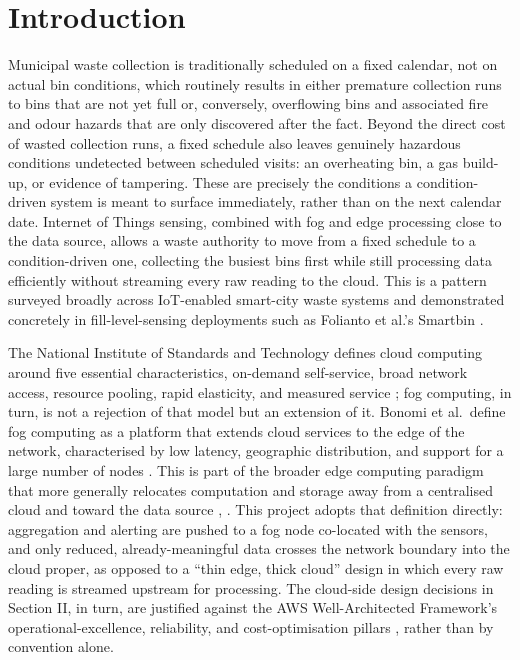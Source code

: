 \documentclass[conference]{IEEEtran}
\begin{document}
\section{Introduction}
Municipal waste collection is traditionally scheduled on a fixed calendar, not on actual bin conditions, which routinely results in either premature collection runs to bins that are not yet full or, conversely, overflowing bins and associated fire and odour hazards that are only discovered after the fact. Beyond the direct cost of wasted collection runs, a fixed schedule also leaves genuinely hazardous conditions undetected between scheduled visits: an overheating bin, a gas build-up, or evidence of tampering. These are precisely the conditions a condition-driven system is meant to surface immediately, rather than on the next calendar date. Internet of Things sensing, combined with fog and edge processing close to the data source, allows a waste authority to move from a fixed schedule to a condition-driven one, collecting the busiest bins first while still processing data efficiently without streaming every raw reading to the cloud. This is a pattern surveyed broadly across IoT-enabled smart-city waste systems \cite{ref1} and demonstrated concretely in fill-level-sensing deployments such as Folianto et al.'s Smartbin \cite{ref2}.

The National Institute of Standards and Technology defines cloud computing around five essential characteristics, on-demand self-service, broad network access, resource pooling, rapid elasticity, and measured service \cite{ref3}; fog computing, in turn, is not a rejection of that model but an extension of it. Bonomi et al.\ define fog computing as a platform that extends cloud services to the edge of the network, characterised by low latency, geographic distribution, and support for a large number of nodes \cite{ref4}. This is part of the broader edge computing paradigm that more generally relocates computation and storage away from a centralised cloud and toward the data source \cite{ref5}, \cite{ref6}. This project adopts that definition directly: aggregation and alerting are pushed to a fog node co-located with the sensors, and only reduced, already-meaningful data crosses the network boundary into the cloud proper, as opposed to a ``thin edge, thick cloud'' design in which every raw reading is streamed upstream for processing. The cloud-side design decisions in Section II, in turn, are justified against the AWS Well-Architected Framework's operational-excellence, reliability, and cost-optimisation pillars \cite{ref7}, rather than by convention alone.
\end{document}
